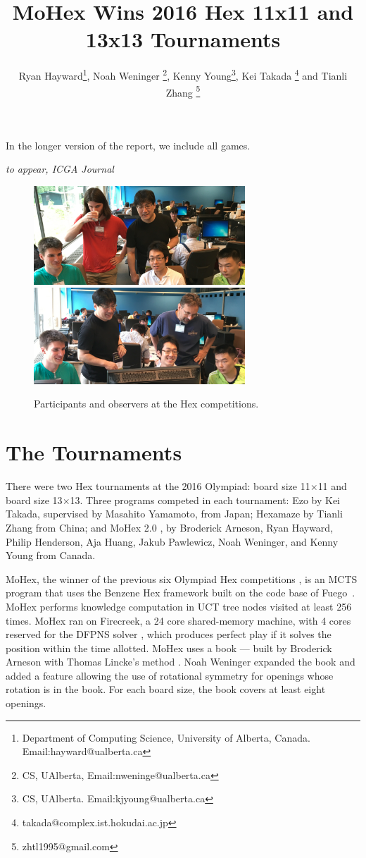 \documentclass{icga}
\title{\sc MoHex Wins 2016 Hex 11x11 and 13x13 Tournaments}
\author{Ryan Hayward\thanks{Department 
of Computing Science, University of Alberta, Canada. Email:hayward@ualberta.ca},
Noah Weninger \thanks{CS, UAlberta, Email:nweninge@ualberta.ca},
Kenny Young\thanks{CS, UAlberta. Email:kjyoung@ualberta.ca},
Kei Takada \thanks{takada@complex.ist.hokudai.ac.jp} and
Tianli Zhang \thanks{zhtl1995@gmail.com}
}
\affiliation{Edmonton, Canada}
\newif\iflong\longtrue  %
\def\Eo{\mbox{\sc Ezo}}
\def\Hz{\mbox{\sc Hexamaze}}
\def\Mx{\mbox{\sc MoHex}}
\def\Fuego{\mbox{\sc Fuego}}
\begin{document}
\maketitle

\iflong
In the longer version of the report, we include all games.
\fi

\vspace*{-2.25in}
{\it to appear, ICGA Journal}
\vspace*{2.0in}

\begin{figure}[hbt]
\includegraphics[width=225pt]{photos/pick.eps}\
\includegraphics[width=225pt]{photos/picr.eps}
\caption{Participants and observers at the Hex competitions.}
\end{figure}

\section{The Tournaments}
There were two Hex tournaments at the 2016 Olympiad:
board size 11$\times$11 and board size 13$\times$13.
Three programs competed in each tournament:
\Eo{} by Kei Takada, supervised by Masahito Yamamoto, from Japan;
\Hz{} by Tianli Zhang from China; and
\Mx{} 2.0 , 
by Broderick Arneson, Ryan Hayward, Philip Henderson, Aja Huang, 
Jakub Pawlewicz, Noah Weninger, and Kenny Young from Canada.

\Mx{}, the winner of the previous six Olympiad Hex competitions
,
is an MCTS program that uses the Benzene Hex framework
built on the code base of \Fuego\ .
\Mx{} performs knowledge computation in UCT tree nodes visited at least 256 times.
\Mx{} ran on Firecreek, a 24 core shared-memory machine, 
with 4 cores reserved for the 
DFPNS solver , which
produces perfect play if it solves the
position within the time allotted.
\Mx{} uses a book ---
built by Broderick Arneson with Thomas Lincke's method 
. 
Noah Weninger expanded the book and added a feature
allowing the use of rotational symmetry for openings
whose rotation is in the book.
For each board size, the book covers at least eight openings.
\end{document}
